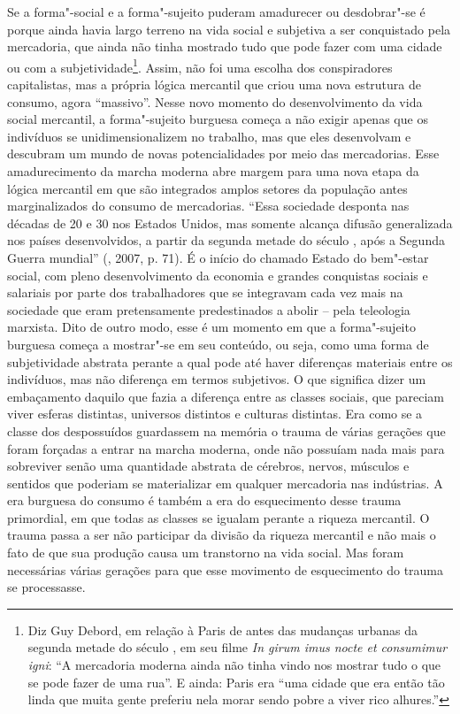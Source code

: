 Se a forma"-social e a forma"-sujeito puderam amadurecer ou desdobrar"-se é
porque ainda havia largo terreno na vida social e subjetiva a ser
conquistado pela mercadoria, que ainda não tinha mostrado tudo que pode
fazer com uma cidade ou com a subjetividade\footnote{Diz Guy Debord, em
  relação à Paris de antes das mudanças urbanas da segunda metade do
  século , em seu filme \emph{In girum imus nocte et consumimur igni}:
  ``A mercadoria moderna ainda não tinha vindo nos mostrar tudo o que se
  pode fazer de uma rua''. E ainda: Paris era ``uma cidade que era então
  tão linda que muita gente preferiu nela morar sendo pobre a viver rico
  alhures.''}. Assim, não foi uma escolha dos conspiradores
capitalistas, mas a própria lógica mercantil que criou uma nova
estrutura de consumo, agora ``massivo''. Nesse novo momento do
desenvolvimento da vida social mercantil, a forma"-sujeito burguesa
começa a não exigir apenas que os indivíduos se unidimensionalizem no
trabalho, mas que eles desenvolvam e descubram um mundo de novas
potencialidades por meio das mercadorias. Esse amadurecimento da marcha
moderna abre margem para uma nova etapa da lógica mercantil em que são
integrados amplos setores da população antes marginalizados do consumo
de mercadorias. ``Essa sociedade desponta nas décadas de 20 e 30 nos
Estados Unidos, mas somente alcança difusão generalizada nos países
desenvolvidos, a partir da segunda metade do século , após a Segunda
Guerra mundial'' (, 2007, p. 71). É o início do chamado Estado
do bem"-estar social, com pleno desenvolvimento da economia e grandes
conquistas sociais e salariais por parte dos trabalhadores que se
integravam cada vez mais na sociedade que eram pretensamente
predestinados a abolir -- pela teleologia marxista. Dito de outro modo,
esse é um momento em que a forma"-sujeito burguesa começa a mostrar"-se em
seu conteúdo, ou seja, como uma forma de subjetividade abstrata perante
a qual pode até haver diferenças materiais entre os indivíduos, mas não
diferença em termos subjetivos. O que significa dizer um embaçamento
daquilo que fazia a diferença entre as classes sociais, que pareciam
viver esferas distintas, universos distintos e culturas distintas. Era
como se a classe dos despossuídos guardassem na memória o trauma de
várias gerações que foram forçadas a entrar na marcha moderna, onde não
possuíam nada mais para sobreviver senão uma quantidade abstrata de
cérebros, nervos, músculos e sentidos que poderiam se materializar em
qualquer mercadoria nas indústrias. A era burguesa do consumo é também a
era do esquecimento desse trauma primordial, em que todas as classes se
igualam perante a riqueza mercantil. O trauma passa a ser não participar
da divisão da riqueza mercantil e não mais o fato de que sua produção
causa um transtorno na vida social. Mas foram necessárias várias
gerações para que esse movimento de esquecimento do trauma se
processasse.

